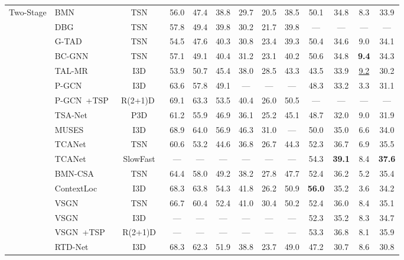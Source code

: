 \begin{table}[t]
{\begin{tabular}{c|l|c|cccccc|cccc}
   \hline
    \multirow{17}{*}{Two-Stage} 
   & BMN~\cite{bmniccv2019} & TSN~\cite{tsn2016eccv}& 56.0 & 47.4 & 38.8 & 29.7 & 20.5 & 38.5 & 50.1 & 34.8 & 8.3 & 33.9  \tabularnewline \cline{4-13}
   & DBG~\cite{dbgaaai2020} & TSN~\cite{tsn2016eccv} & 57.8 & 49.4 & 39.8 & 30.2 & 21.7 & 39.8 & --- & --- & --- & --- \tabularnewline \cline{4-13}
   & G-TAD~\cite{gtadcvpr2020} & TSN~\cite{tsn2016eccv} & 54.5 & 47.6 & 40.3 & 30.8 & 23.4 & 39.3 & 50.4 & 34.6 & 9.0 & 34.1\tabularnewline \cline{4-13}
   & BC-GNN~\cite{bcgnneccv2020} & TSN~\cite{tsn2016eccv} & 57.1 & 49.1 & 40.4 & 31.2 & 23.1 & 40.2 & 50.6 & 34.8 & \textbf{9.4} & 34.3\tabularnewline \cline{4-13}
   & TAL-MR~\cite{bottumuptaleccv2020} & I3D~\cite{kinetics2017cvpr} & 53.9 &50.7& 45.4 &38.0& 28.5 & 43.3 & 43.5 & 33.9 & \underline{9.2} & 30.2 \tabularnewline \cline{4-13}
   & P-GCN~\cite{pgcniccv2019} & I3D~\cite{kinetics2017cvpr} & 63.6 &57.8 &49.1 & --- & --- & --- & 48.3 & 33.2 & 3.3 & 31.1 \tabularnewline \cline{4-13}
   & P-GCN~\cite{pgcniccv2019}+TSP~\cite{tspiccvworkshop2021} & R(2+1)D ~\cite{res2p1d2018cvpr} & 69.1 & 63.3 & 53.5 & 40.4 & 26.0 & 50.5 & --- & --- & --- & --- \tabularnewline \cline{4-13}
   & TSA-Net~\cite{gong2020scale} & P3D~\cite{qiu2017learning} & 61.2 & 55.9 &46.9 & 36.1 & 25.2  & 45.1 & 48.7 & 32.0 & 9.0 & 31.9 \tabularnewline \cline{4-13}
   & MUSES~\cite{liu2021multi} & I3D~\cite{kinetics2017cvpr} & 68.9 & 64.0 & 56.9 & 46.3 & 31.0 & --- & 50.0 & 35.0 & 6.6 & 34.0
     \tabularnewline \cline{4-13}
   & TCANet~\cite{tcanetcvpr2021} & TSN~\cite{tsn2016eccv} & 60.6 & 53.2 & 44.6 & 36.8 & 26.7 & 44.3 & 52.3 & 36.7 & 6.9 & 35.5 \tabularnewline \cline{4-13}
   & TCANet~\cite{tcanetcvpr2021} & SlowFast~\cite{slowfasticcv2019} & --- & --- & --- & --- & --- & --- & 54.3 & \textbf{39.1} & 8.4 & \textbf{37.6}
   \tabularnewline \cline{4-13}
   & BMN-CSA~\cite{csaiccv2021} & TSN~\cite{tsn2016eccv} & 64.4 & 58.0 & 49.2 & 38.2 & 27.8 & 47.7 & 52.4 & 36.2 & 5.2 & 35.4
     \tabularnewline \cline{4-13}
   & ContextLoc~\cite{contextlociccv2021} & I3D~\cite{kinetics2017cvpr} & 68.3 & 63.8 & 54.3 & 41.8 & 26.2 & 50.9 & \textbf{56.0} & 35.2 & 3.6 & 34.2
   \tabularnewline \cline{4-13}
   & VSGN~\cite{vsgniccv2021} & TSN~\cite{tsn2016eccv} & 66.7 & 60.4 & 52.4 & 41.0 & 30.4 & 50.2 & 52.4 & 36.0 & 8.4 & 35.1
     \tabularnewline \cline{4-13}
   & VSGN~\cite{vsgniccv2021}  & I3D~\cite{kinetics2017cvpr} & --- & --- & --- & --- & --- & --- & 52.3 & 35.2 & 8.3 & 34.7
     \tabularnewline \cline{4-13}
    & VSGN~\cite{vsgniccv2021}+TSP~\cite{tspiccvworkshop2021}  & R(2+1)D~\cite{res2p1d2018cvpr} & --- & --- & --- & --- & --- & --- & 53.3  & 36.8 & 8.1 & 35.9
    \tabularnewline \cline{4-13}
    & RTD-Net~\cite{tan2021relaxed} & I3D~\cite{kinetics2017cvpr} & 68.3 & 62.3 & 51.9 & 38.8 & 23.7 & 49.0 & 47.2  & 30.7 & 8.6 & 30.8
    \tabularnewline \cline{4-13}
     

\end{tabular}}
\end{table}
